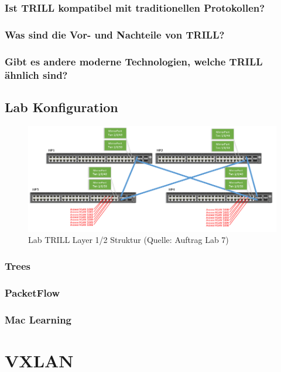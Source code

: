 \subsubsection{Ist TRILL kompatibel mit traditionellen Protokollen?} %

\subsubsection{Was sind die Vor- und Nachteile von TRILL?}%

\subsubsection{Gibt es andere moderne Technologien, welche TRILL ähnlich sind?}%


\subsection{Lab Konfiguration}
\begin{figure}[h]
	\centering
	\includegraphics[width=1\linewidth]{trill_network_layer2}
	\caption{Lab TRILL Layer 1/2 Struktur (Quelle: Auftrag Lab 7)}
	\label{fig:trillnetworklayer2}
\end{figure}

\subsubsection{Trees}

\subsubsection{PacketFlow}

\subsubsection{Mac Learning}


\section{VXLAN}

